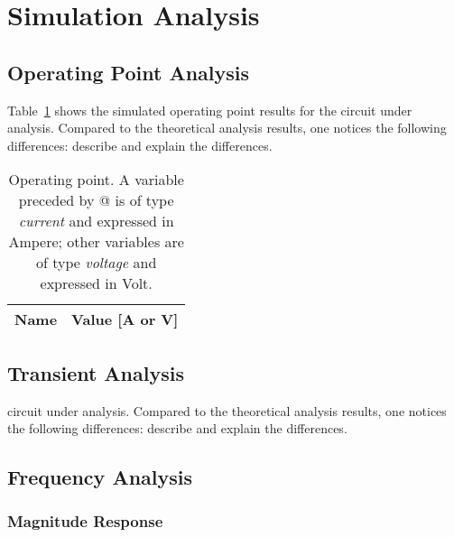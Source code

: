 \section{Simulation Analysis}
\label{sec:simulation}

\subsection{Operating Point Analysis}

Table~\ref{tab:op} shows the simulated operating point results for the circuit
under analysis. Compared to the theoretical analysis results, one notices the
following differences: describe and explain the differences.

\begin{table}[h]
  \centering
  \begin{tabular}{|l|r|}
    \hline    
    {\bf Name} & {\bf Value [A or V]} \\ \hline
    
  \end{tabular}
  \caption{Operating point. A variable preceded by @ is of type {\em current}
    and expressed in Ampere; other variables are of type {\it voltage} and expressed in
    Volt.}
  \label{tab:op}
\end{table}

\lipsum[1-1]

\subsection{Transient Analysis}

circuit under analysis. Compared to the theoretical analysis results, one
notices the following differences: describe and explain the differences.


\lipsum[1-1]



\subsection{Frequency Analysis}

\subsubsection{Magnitude Response}

